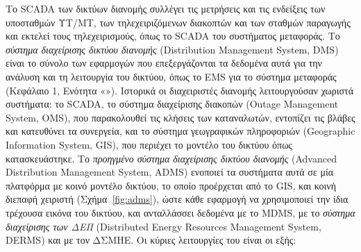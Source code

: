 Το SCADA των δικτύων διανομής συλλέγει τις μετρήσεις και τις ενδείξεις των υποσταθμών ΥΤ/ΜΤ,
των τηλεχειριζόμενων διακοπτών και των σταθμών παραγωγής και εκτελεί τους τηλεχειρισμούς,
όπως το SCADA του συστήματος μεταφοράς. Το \emph{σύστημα διαχείρισης δικτύου διανομής} (Distribution
Management System, DMS) είναι το σύνολο των εφαρμογών που επεξεργάζονται τα δεδομένα αυτά για
την ανάλυση και τη λειτουργία του δικτύου, όπως το EMS για το σύστημα μεταφοράς (Κεφάλαιο 1,
Ενότητα «»). Ιστορικά οι διαχειριστές διανομής λειτουργούσαν χωριστά
συστήματα: το SCADA, το σύστημα διαχείρισης διακοπών (Outage Management System, OMS), που
παρακολουθεί τις κλήσεις των καταναλωτών, εντοπίζει τις βλάβες και κατευθύνει τα συνεργεία,
και το σύστημα γεωγραφικών πληροφοριών (Geographic Information System, GIS), που περιέχει το
μοντέλο του δικτύου όπως κατασκευάστηκε. Το \emph{προηγμένο σύστημα διαχείρισης δικτύου διανομής}
(Advanced Distribution Management System, ADMS) ενοποιεί τα συστήματα αυτά σε μία πλατφόρμα με
κοινό μοντέλο δικτύου, το οποίο προέρχεται από το GIS, και κοινή διεπαφή χειριστή
(Σχήμα~\ref{fig:adms}), ώστε κάθε εφαρμογή να χρησιμοποιεί την ίδια τρέχουσα εικόνα του
δικτύου, και ανταλλάσσει δεδομένα με το MDMS, με το \emph{σύστημα διαχείρισης των ΔΕΠ}
(Distributed Energy Resources Management System, DERMS) και με τον ΔΣΜΗΕ. Οι κύριες
λειτουργίες του είναι οι εξής:

